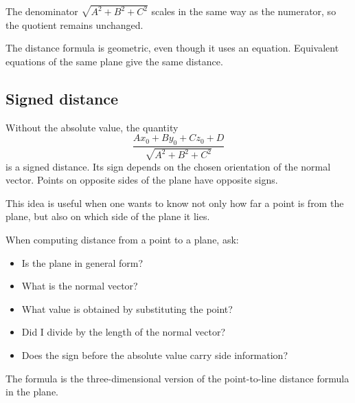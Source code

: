 The denominator \(\sqrt{A^2+B^2+C^2}\) scales in the same way as the numerator, so the quotient remains unchanged.

\begin{remarkbox}
The distance formula is geometric, even though it uses an equation. Equivalent equations of the same plane give the same distance.
\end{remarkbox}

\subsection*{Signed distance}

Without the absolute value, the quantity
\[
\frac{Ax_0+By_0+Cz_0+D}{\sqrt{A^2+B^2+C^2}}
\]
is a signed distance. Its sign depends on the chosen orientation of the normal vector. Points on opposite sides of the plane have opposite signs.

This idea is useful when one wants to know not only how far a point is from the plane, but also on which side of the plane it lies.

\begin{summarybox}
When computing distance from a point to a plane, ask:
\begin{itemize}
\item Is the plane in general form?
\item What is the normal vector?
\item What value is obtained by substituting the point?
\item Did I divide by the length of the normal vector?
\item Does the sign before the absolute value carry side information?
\end{itemize}
\end{summarybox}

The formula is the three-dimensional version of the point-to-line distance formula in the plane.
